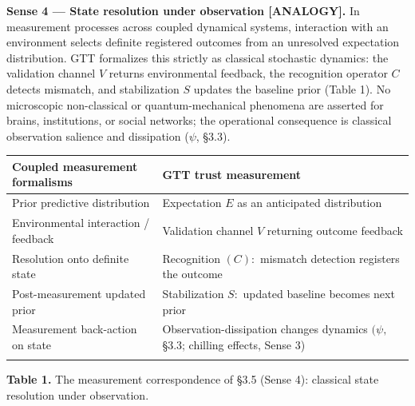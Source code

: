 \documentclass[
]{article}
\newcounter{none} %
\begin{document}
\textbf{Sense 4 --- State resolution under observation {[}ANALOGY{]}.}
In measurement processes across coupled dynamical systems, interaction
with an environment selects definite registered outcomes from an
unresolved expectation distribution. GTT formalizes this strictly as
classical stochastic dynamics: the validation channel \(V\) returns
environmental feedback, the recognition operator \(C\) detects mismatch,
and stabilization \(S\) updates the baseline prior (Table 1). No
microscopic non-classical or quantum-mechanical phenomena are asserted
for brains, institutions, or social networks; the operational
consequence is classical observation salience and dissipation (\(\psi\),
§3.3).

{\def\LTcaptype{none} %
\begin{longtable}[]{@{}
  >{\raggedright\arraybackslash}p{}
  >{\raggedright\arraybackslash}p{}@{}}
\toprule\noalign{}
\begin{minipage}[b]{\linewidth}\raggedright
\textbf{Coupled measurement formalisms}
\end{minipage} & \begin{minipage}[b]{\linewidth}\raggedright
\textbf{GTT trust measurement}
\end{minipage} \\
\midrule\noalign{}
\endhead
\bottomrule\noalign{}
\endlastfoot
Prior predictive distribution & Expectation \(E\) as an anticipated
distribution \\
Environmental interaction / feedback & Validation channel \(V\)
returning outcome feedback \\
Resolution onto definite state & Recognition \((C):\) mismatch detection
registers the outcome \\
Post-measurement updated prior & Stabilization \(S:\) updated baseline
becomes next prior \\
Measurement back-action on state & Observation-dissipation changes
dynamics \((\psi,\) §3.3; chilling effects, Sense 3) \\
& \\
\end{longtable}
}

\textbf{Table 1.} The measurement correspondence of §3.5 (Sense 4):
classical state resolution under observation.
\end{document}
